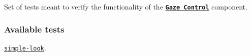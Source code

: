 Set of tests meant to verify the functionality of the \href{http://wiki.icub.org/iCub/main/dox/html/icub_gaze_interface.html}{\tt {\bfseries Gaze Control}} component.

\subsubsection*{Available tests}


\begin{DoxyItemize}
\item \href{https://github.com/robotology/icub-tests/blob/master/src/gaze-control/simple-look}{\tt {\ttfamily simple-\/look}}. 
\end{DoxyItemize}